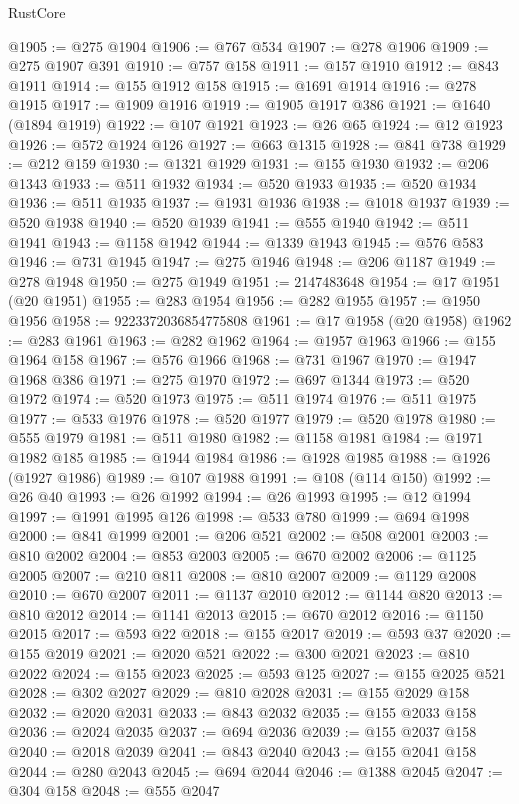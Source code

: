 \begin{lexlean}{RustCore}
\begin{coremodule}
@1905 := @275 @1904
@1906 := @767 @534
@1907 := @278 @1906
@1909 := @275 @1907 @391
@1910 := @757 @158
@1911 := @157 @1910
@1912 := @843 @1911
@1914 := @155 @1912 @158
@1915 := @1691 @1914
@1916 := @278 @1915
@1917 := @1909 @1916
@1919 := @1905 @1917 @386
@1921 := @1640 (@1894 @1919)
@1922 := @107 @1921
@1923 := @26 @65
@1924 := @12 @1923
@1926 := @572 @1924 @126
@1927 := @663 @1315
@1928 := @841 @738
@1929 := @212 @159
@1930 := @1321 @1929
@1931 := @155 @1930
@1932 := @206 @1343
@1933 := @511 @1932
@1934 := @520 @1933
@1935 := @520 @1934
@1936 := @511 @1935
@1937 := @1931 @1936
@1938 := @1018 @1937
@1939 := @520 @1938
@1940 := @520 @1939
@1941 := @555 @1940
@1942 := @511 @1941
@1943 := @1158 @1942
@1944 := @1339 @1943
@1945 := @576 @583
@1946 := @731 @1945
@1947 := @275 @1946
@1948 := @206 @1187
@1949 := @278 @1948
@1950 := @275 @1949
@1951 := 2147483648
@1954 := @17 @1951 (@20 @1951)
@1955 := @283 @1954
@1956 := @282 @1955
@1957 := @1950 @1956
@1958 := 9223372036854775808
@1961 := @17 @1958 (@20 @1958)
@1962 := @283 @1961
@1963 := @282 @1962
@1964 := @1957 @1963
@1966 := @155 @1964 @158
@1967 := @576 @1966
@1968 := @731 @1967
@1970 := @1947 @1968 @386
@1971 := @275 @1970
@1972 := @697 @1344
@1973 := @520 @1972
@1974 := @520 @1973
@1975 := @511 @1974
@1976 := @511 @1975
@1977 := @533 @1976
@1978 := @520 @1977
@1979 := @520 @1978
@1980 := @555 @1979
@1981 := @511 @1980
@1982 := @1158 @1981
@1984 := @1971 @1982 @185
@1985 := @1944 @1984
@1986 := @1928 @1985
@1988 := @1926 (@1927 @1986)
@1989 := @107 @1988
@1991 := @108 (@114 @150)
@1992 := @26 @40
@1993 := @26 @1992
@1994 := @26 @1993
@1995 := @12 @1994
@1997 := @1991 @1995 @126
@1998 := @533 @780
@1999 := @694 @1998
@2000 := @841 @1999
@2001 := @206 @521
@2002 := @508 @2001
@2003 := @810 @2002
@2004 := @853 @2003
@2005 := @670 @2002
@2006 := @1125 @2005
@2007 := @210 @811
@2008 := @810 @2007
@2009 := @1129 @2008
@2010 := @670 @2007
@2011 := @1137 @2010
@2012 := @1144 @820
@2013 := @810 @2012
@2014 := @1141 @2013
@2015 := @670 @2012
@2016 := @1150 @2015
@2017 := @593 @22
@2018 := @155 @2017
@2019 := @593 @37
@2020 := @155 @2019
@2021 := @2020 @521
@2022 := @300 @2021
@2023 := @810 @2022
@2024 := @155 @2023
@2025 := @593 @125
@2027 := @155 @2025 @521
@2028 := @302 @2027
@2029 := @810 @2028
@2031 := @155 @2029 @158
@2032 := @2020 @2031
@2033 := @843 @2032
@2035 := @155 @2033 @158
@2036 := @2024 @2035
@2037 := @694 @2036
@2039 := @155 @2037 @158
@2040 := @2018 @2039
@2041 := @843 @2040
@2043 := @155 @2041 @158
@2044 := @280 @2043
@2045 := @694 @2044
@2046 := @1388 @2045
@2047 := @304 @158
@2048 := @555 @2047

\end{coremodule}
\end{lexlean}
